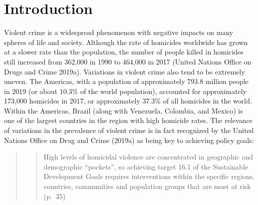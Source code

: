 \documentclass[smallextended]{svjour3}       %
\begin{document}
\def\spacingset#1{\renewcommand{\baselinestretch}%
{#1}\small\normalsize} \spacingset{1}


\hypertarget{intro}{%
\section{Introduction}\label{intro}}

Violent crime is a widespread phenomenon with negative impacts on many
spheres of life and society. Although the rate of homicides worldwide
has grown at a slower rate than the population, the number of people
killed in homicides still increased from 362,000 in 1990 to 464,000 in
2017 (United Nations Office on Drugs and Crime 2019a). Variations in
violent crime also tend to be extremely uneven. The Americas, with a
population of approximately 793.8 million people in 2019 (or about
10.3\% of the world population), accounted for approximately 173,000
homicides in 2017, or approximately 37.3\% of all homicides in the
world. Within the Americas, Brazil (along with Venezuela, Colombia, and
Mexico) is one of the largest countries in the region with high homicide
rates. The relevance of variations in the prevalence of violent crime is
in fact recognized by the United Nations Office on Drug and Crime
(2019a) as being key to achieving policy goals:

\begin{quote}
\begin{quote}
High levels of homicidal violence are concentrated in geographic and
demographic ``pockets'', so achieving target 16.1 of the Sustainable
Development Goals requires interventions within the specific regions,
countries, communities and population groups that are most at risk
(p.~35)
\end{quote}
\end{quote}
\end{document}
